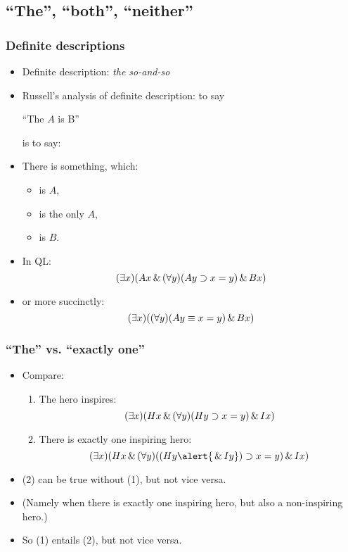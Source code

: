 \subsection{``The'', ``both'', ``neither''}

\begin{frame}
    \frametitle{Definite descriptions}

\begin{itemize}[<+->]
\item Definite description: \emph{the so-and-so}
\item Russell's analysis of definite description: to say\\[1ex]
\centerline{``The $A$ is B''}
is to say:
\item There is something, which:
\begin{itemize}[<+->]
\item is $A$,
\item is the only $A$,
\item is $B$.
\end{itemize}
\item In QL:
\[
(\exists x)(Ax \,\&\, (\forall y)(Ay \supset x = y) \,\&\, Bx)
\]
\item or more succinctly:
\[
(\exists x)((\forall y)(Ay \equiv x = y) \,\&\, Bx)
\]
\end{itemize}
\end{frame}

\begin{frame}
\frametitle{``The'' vs. ``exactly one''}

\begin{itemize}[<+->]
\item Compare:
\begin{enumerate}[<+->]
\item The hero inspires:
\[(\exists x)(Hx \,\&\, (\forall y)(Hy \supset x = y) \,\&\, Ix)\]
\item There is exactly one inspiring hero:
\[\qt{\exists}{x}(H\qv{x} \land \qt{\forall}{y}((H\qv{y} \alert{{}\land I\qv{y}}) \to x = y) \land I\qv{x})\]
\end{enumerate}
\item (2) can be true without (1), but not vice versa.
\item (Namely when there is exactly one inspiring hero, but also a non-inspiring hero.)
\item So (1) entails (2), but not vice versa.
\end{itemize}
\end{frame}


